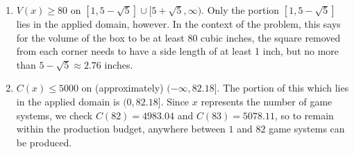 \begin{enumerate}
\setcounter{enumi}{\value{HW}}

\item  $V(x) \geq 80$ on $[1,5-\sqrt{5}] \cup [5+\sqrt{5}, \infty)$.  Only the portion $[1,5-\sqrt{5}]$ lies in the applied domain, however.   In the context of the problem, this says for the volume of the box to be at least 80 cubic inches, the square removed from each corner needs to have a side length of at least 1 inch, but no more than $5-\sqrt{5} \approx 2.76$ inches.

\item $C(x) \leq 5000$ on (approximately) $(-\infty, 82.18]$.  The portion of this which lies in the applied domain is $(0,82.18]$.  Since $x$ represents the number of game systems, we check $C(82) = 4983.04$ and $C(83) = 5078.11$, so to remain within the production budget, anywhere between $1$ and $82$ game systems can be produced.


\setcounter{HW}{\value{enumi}}
\end{enumerate}

\closegraphsfile